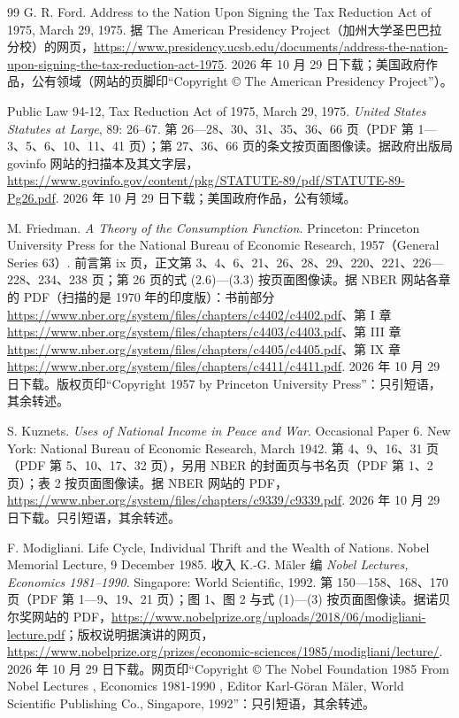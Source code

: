 \begin{thebibliography}{99}
 G. R. Ford. Address to the Nation Upon Signing the Tax Reduction Act of 1975, March 29, 1975. 据 The American Presidency Project（加州大学圣巴巴拉分校）的网页，\url{https://www.presidency.ucsb.edu/documents/address-the-nation-upon-signing-the-tax-reduction-act-1975}. 2026 年 10 月 29 日下载；美国政府作品，公有领域（网站的页脚印“Copyright © The American Presidency Project”）。

 Public Law 94-12, Tax Reduction Act of 1975, March 29, 1975. \emph{United States Statutes at Large}, 89: 26--67. 第 26—28、30、31、35、36、66 页（PDF 第 1—3、5、6、10、11、41 页）；第 27、36、66 页的条文按页面图像读。据政府出版局 govinfo 网站的扫描本及其文字层，\url{https://www.govinfo.gov/content/pkg/STATUTE-89/pdf/STATUTE-89-Pg26.pdf}. 2026 年 10 月 29 日下载；美国政府作品，公有领域。

 M. Friedman. \emph{A Theory of the Consumption Function}. Princeton: Princeton University Press for the National Bureau of Economic Research, 1957（General Series 63）. 前言第 ix 页，正文第 3、4、6、21、26、28、29、220、221、226—228、234、238 页；第 26 页的式 (2.6)—(3.3) 按页面图像读。据 NBER 网站各章的 PDF（扫描的是 1970 年的印度版）：书前部分 \url{https://www.nber.org/system/files/chapters/c4402/c4402.pdf}、第 I 章 \url{https://www.nber.org/system/files/chapters/c4403/c4403.pdf}、第 III 章 \url{https://www.nber.org/system/files/chapters/c4405/c4405.pdf}、第 IX 章 \url{https://www.nber.org/system/files/chapters/c4411/c4411.pdf}. 2026 年 10 月 29 日下载。版权页印“Copyright 1957 by Princeton University Press”：只引短语，其余转述。

 S. Kuznets. \emph{Uses of National Income in Peace and War}. Occasional Paper 6. New York: National Bureau of Economic Research, March 1942. 第 4、9、16、31 页（PDF 第 5、10、17、32 页），另用 NBER 的封面页与书名页（PDF 第 1、2 页）；表 2 按页面图像读。据 NBER 网站的 PDF，\url{https://www.nber.org/system/files/chapters/c9339/c9339.pdf}. 2026 年 10 月 29 日下载。只引短语，其余转述。

 F. Modigliani. Life Cycle, Individual Thrift and the Wealth of Nations. Nobel Memorial Lecture, 9 December 1985. 收入 K.-G. Mäler 编 \emph{Nobel Lectures, Economics 1981--1990}. Singapore: World Scientific, 1992. 第 150—158、168、170 页（PDF 第 1—9、19、21 页）；图 1、图 2 与式 (1)—(3) 按页面图像读。据诺贝尔奖网站的 PDF，\url{https://www.nobelprize.org/uploads/2018/06/modigliani-lecture.pdf}；版权说明据演讲的网页，\url{https://www.nobelprize.org/prizes/economic-sciences/1985/modigliani/lecture/}. 2026 年 10 月 29 日下载。网页印“Copyright © The Nobel Foundation 1985 From Nobel Lectures , Economics 1981-1990 , Editor Karl-Göran Mäler, World Scientific Publishing Co., Singapore, 1992”：只引短语，其余转述。


\end{thebibliography}
